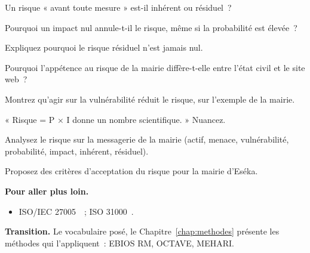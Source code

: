 \begin{boxexo}[title={\ding{45}\quad Exercice~11.3. Inhérent ou résiduel \niveaubase}]
Un risque « avant toute mesure » est-il inhérent ou résiduel~?
\end{boxexo}

\begin{boxexo}[title={\ding{45}\quad Exercice~11.4. Formule \niveaumoyen}]
Pourquoi un impact nul annule-t-il le risque, même si la probabilité est
élevée~?
\end{boxexo}

\begin{boxexo}[title={\ding{45}\quad Exercice~11.5. Résiduel jamais nul \niveaumoyen}]
Expliquez pourquoi le risque résiduel n'est jamais nul.
\end{boxexo}

\begin{boxexo}[title={\ding{45}\quad Exercice~11.6. Appétence \niveaumoyen}]
Pourquoi l'appétence au risque de la mairie diffère-t-elle entre l'état civil
et le site web~?
\end{boxexo}

\begin{boxexo}[title={\ding{45}\quad Exercice~11.7. Casser un maillon \niveaumoyen}]
Montrez qu'agir sur la vulnérabilité réduit le risque, sur l'exemple de la
mairie.
\end{boxexo}

\begin{boxexo}[title={\ding{45}\quad Exercice~11.8. Chiffre défendable \niveaumoyen}]
« Risque = P × I donne un nombre scientifique. » Nuancez.
\end{boxexo}

\begin{boxexo}[title={\ding{45}\quad Exercice~11.9. Analyse d'actif \niveauexpert}]
Analysez le risque sur la messagerie de la mairie (actif, menace,
vulnérabilité, probabilité, impact, inhérent, résiduel).
\end{boxexo}

\begin{boxexo}[title={\ding{45}\quad Exercice~11.10. Critères d'acceptation \niveauexpert}]
Proposez des critères d'acceptation du risque pour la mairie d'Eséka.
\end{boxexo}

\bigskip

\begin{boxinfo}
\textbf{Pour aller plus loin.}
\begin{itemize}
    \item ISO/IEC 27005~\cite{iso27005}~; ISO 31000~\cite{iso31000}.
\end{itemize}
\end{boxinfo}

\begin{boxinfo}
\textbf{Transition.} Le vocabulaire posé, le Chapitre~\ref{chap:methodes}
présente les méthodes qui l'appliquent~: EBIOS RM, OCTAVE, MEHARI.
\end{boxinfo}
